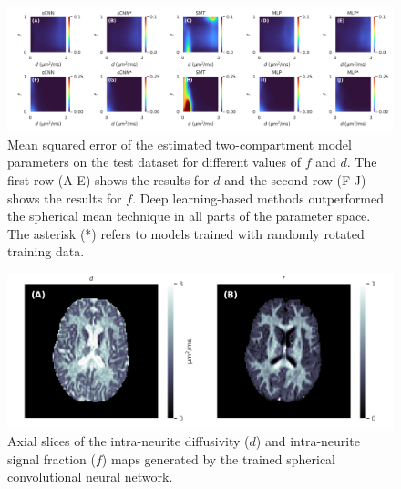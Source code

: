 \documentclass[10pt, letterpaper, oneside]{article}
\begin{document}
\begin{figure}
  \centering
  \includegraphics[width=.99\linewidth]{figures/se.png}
  \caption{Mean squared error of the estimated two-compartment model parameters on the test dataset for different values of $f$ and $d$. The first row (A-E) shows the results for $d$ and the second row (F-J) shows the results for $f$. Deep learning-based methods outperformed the spherical mean technique in all parts of the parameter space. The asterisk (*) refers to models trained with randomly rotated training data.}
  \label{fig:2-compartment_model_prediction_accuracy}
\end{figure}

\begin{figure}
  \centering
  \includegraphics[width=.99\linewidth]{figures/2-compartment-model-maps.png}
  \caption{Axial slices of the intra-neurite diffusivity ($d$) and intra-neurite signal fraction ($f$) maps generated by the trained spherical convolutional neural network.}
  \label{fig:2-compartment_model_maps}
\end{figure}
\end{document}
